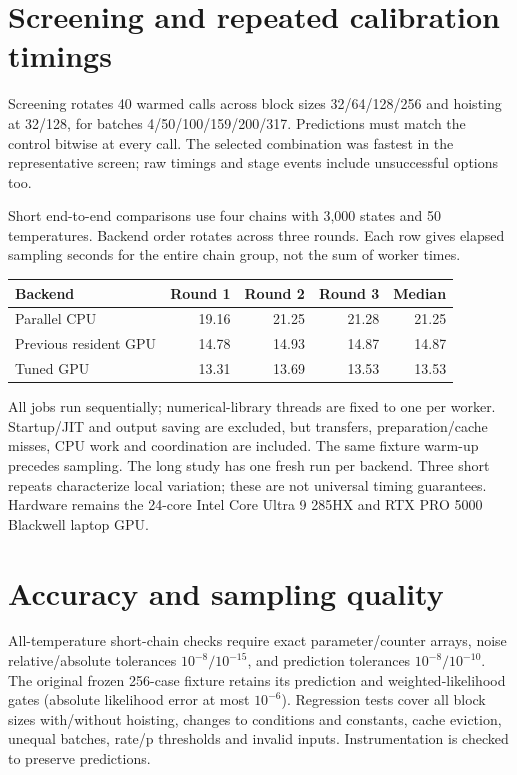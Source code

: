 \documentclass[11pt]{article}
\begin{document}
\section*{Screening and repeated calibration timings}
Screening rotates 40 warmed calls across block sizes 32/64/128/256 and hoisting
at 32/128, for batches 4/50/100/159/200/317. Predictions must match the control
bitwise at every call. The selected combination was fastest in the representative
screen; raw timings and stage events include unsuccessful options too.

Short end-to-end comparisons use four chains with 3,000 states and 50 temperatures.
Backend order rotates across three rounds. Each row gives elapsed sampling seconds
for the entire chain group, not the sum of worker times.
\begin{center}\begin{tabular}{lrrrr}\toprule
Backend & Round 1 & Round 2 & Round 3 & Median\\\midrule
Parallel CPU & 19.16 & 21.25 & 21.28 & 21.25\\
Previous resident GPU & 14.78 & 14.93 & 14.87 & 14.87\\
Tuned GPU & 13.31 & 13.69 & 13.53 & 13.53\\
\bottomrule\end{tabular}\end{center}
All jobs run sequentially; numerical-library threads are fixed to one per worker.
Startup/JIT and output saving are excluded, but transfers, preparation/cache misses,
CPU work and coordination are included. The same fixture warm-up precedes sampling.
The long study has one fresh run per backend. Three short repeats characterize
local variation; these are not universal timing guarantees. Hardware remains the
24-core Intel Core Ultra 9 285HX and RTX PRO 5000 Blackwell laptop GPU.
\section*{Accuracy and sampling quality}
All-temperature short-chain checks require exact parameter/counter arrays, noise
relative/absolute tolerances $10^{-8}/10^{-15}$, and prediction tolerances
$10^{-8}/10^{-10}$. The original frozen 256-case fixture retains its prediction
and weighted-likelihood gates (absolute likelihood error at most $10^{-6}$).
Regression tests cover all block sizes with/without hoisting, changes to conditions
and constants, cache eviction, unequal batches, rate/p thresholds and invalid inputs.
Instrumentation is checked to preserve predictions.
\end{document}

